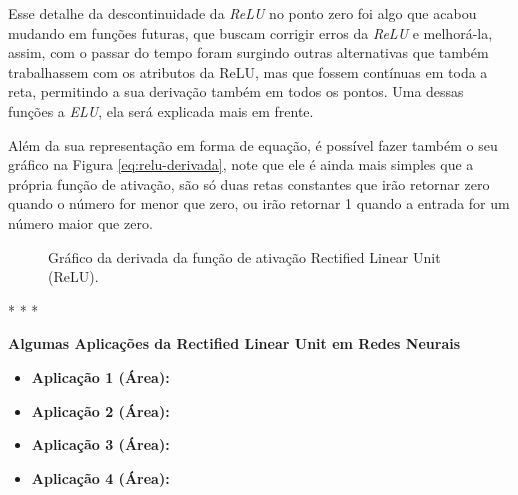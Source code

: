 Esse detalhe da descontinuidade da \textit{ReLU} no ponto zero foi algo que acabou mudando em funções futuras, que buscam corrigir erros da \textit{ReLU} e melhorá-la, assim, com o passar do tempo foram surgindo outras alternativas que também trabalhassem com os atributos da ReLU, mas que fossem contínuas em toda a reta, permitindo a sua derivação também em todos os pontos. Uma dessas funções a \textit{ELU}, ela será explicada mais em frente.

Além da sua representação em forma de equação, é possível fazer também o seu gráfico na Figura \ref{eq:relu-derivada}, note que ele é ainda mais simples que a própria função de ativação, são só duas retas constantes que irão retornar zero quando o número for menor que zero, ou irão retornar 1 quando a entrada for um número maior que zero.

\begin{figure}[h!] %
    \centering %
        \caption{Gráfico da derivada da função de ativação Rectified Linear Unit (ReLU).}
    \label{fig:relu-derivada}
\end{figure}

\medskip
\begin{center}
 * * *
\end{center}
\medskip

\textbf{Algumas Aplicações da Rectified Linear Unit em Redes Neurais} 
\vspace{1em}

\begin{itemize}
    \item \textbf{Aplicação 1 (Área):}
    \item \textbf{Aplicação 2 (Área):}
    \item \textbf{Aplicação 3 (Área):}
    \item \textbf{Aplicação 4 (Área):}
\end{itemize}

